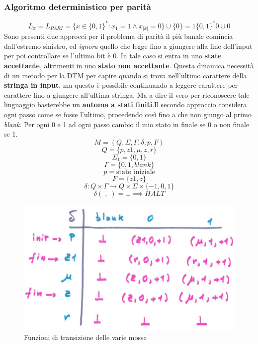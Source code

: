 \documentclass{article}
\begin{document}
\subsubsection{Algoritmo deterministico per parità}
$$L_\pi=L_{PARI}=\{x\in\{0,1\}^*:x_1=1\land x_{|x|}=0\}\cup\{0\}=1\{0,1\}^*0\cup 0$$
Sono presenti due approcci per il problema di parità il più banale
comincia dall'estremo sinistro, ed \textit{ignora} quello che legge
fino a giungere alla fine dell'input per poi controllare se l'ultimo bit è $0$.\newline\newline
In tale caso si entra in uno \textbf{state accettante}, altrimenti in uno \textbf{stato
non accettante}. Questa dinamica necessità di un metodo per la DTM
per capire quando si trova nell'ultimo carattere della \textbf{stringa in input},
ma questo è possibile continuando a leggere carattere per carattere fino a
giungere all'ultima stringa.\newline\newline
Ma a dire il vero per riconoscere tale linguaggio basterebbe un \textbf{automa a stati
finiti}.\newline\newline Il secondo approccio considera
ogni passo come se fosse l'ultimo, procedendo così fino a che non
giungo al primo \textit{blank}. Per ogni 0 e 1 ad ogni
passo cambio il mio stato in finale se 0 o non finale se 1.
\pagebreak
$$M=(Q,\Sigma,\Gamma,\delta,p,F)$$
$$Q=\{p,z1,\mu,z,r\}$$
$$\Sigma_1=\{0,1\}$$
$$\Gamma=\{0,1,blank\}$$
$$p=\text{stato iniziale}$$
$$F=\{z1,z\}$$
$$\delta:Q\times\Gamma\rightarrow Q\times\Sigma\times\{-1,0,1\}$$
$$\delta(\;,\;)=\bot\implies HALT$$
\begin{figure}[H]
    \centering
    \includegraphics[scale=0.6]{images/dtm_lpari.png}
    \caption{Funzioni di transizione delle varie mosse}
\end{figure}
\end{document}
